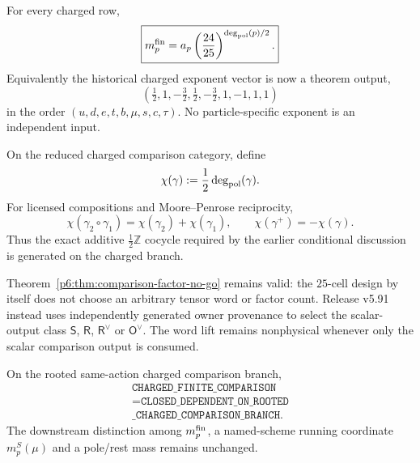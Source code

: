 \documentclass[12pt,a4paper]{article}
\begin{document}
\begin{corollary}
\label{p6:cor:v591-derived-charged-comparison-character}
For every charged row,
\[
 \boxed{m_p^{\rm fin}
 =a_p\left(\frac{24}{25}\right)^{\deg_{\rm pol}(p)/2}.}
\]
Equivalently the historical charged exponent vector is now a theorem output,
\[
 \boxed{\left(\tfrac12,1,-\tfrac32,\tfrac12,-\tfrac32,1,-1,1,1\right)}
\]
in the order $(u,d,e,t,b,\mu,s,c,\tau)$.  No particle-specific exponent is an
independent input.
\end{corollary}

\begin{corollary}
\label{p6:cor:v591-additive-charged-comparison-cocycle}
On the reduced charged comparison category, define
\[
 \chi(\gamma):=\frac12\deg_{\rm pol}(\gamma).
\]
For licensed compositions and Moore--Penrose reciprocity,
\[
 \boxed{\chi(\gamma_2\circ\gamma_1)=\chi(\gamma_2)+\chi(\gamma_1),
 \qquad \chi(\gamma^+)=-\chi(\gamma).}
\]
Thus the exact additive $\tfrac12\mathbb Z$ cocycle required by the earlier
conditional discussion is generated on the charged branch.
\end{corollary}

\begin{remark}
\label{p6:rem:v591-no-conflict-factor-count-no-go}
Theorem~\ref{p6:thm:comparison-factor-no-go} remains valid: the $25$-cell
design by itself does not choose an arbitrary tensor word or factor count.
Release v5.91 instead uses independently generated owner provenance to select
the scalar-output class $\mathsf S$, $\mathsf R$, $\mathsf R^\vee$ or
$\mathsf O^\vee$.  The word lift remains nonphysical whenever only the scalar
comparison output is consumed.
\end{remark}

\begin{corollary}
\label{p6:cor:v591-charged-comparison-closure-status}
On the rooted same-action charged comparison branch,
\[
 \boxed{\begin{gathered}
 \texttt{CHARGED\_FINITE\_COMPARISON}\\
 =\texttt{CLOSED\_DEPENDENT\_ON\_ROOTED}\\
 \texttt{\_CHARGED\_COMPARISON\_BRANCH}.
 \end{gathered}}
\]
The downstream distinction among $m_p^{\rm fin}$, a named-scheme running
coordinate $m_p^S(\mu)$ and a pole/rest mass remains unchanged.
\end{corollary}
\end{document}
